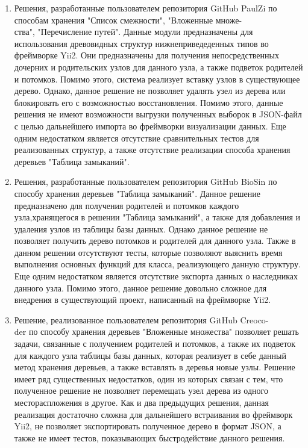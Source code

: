 \documentclass[a4paper,14pt]{extreport}
\theoremstyle{definition}
\begin{document}
\begin{enumerate}
\item Решения, разработанные пользователем репозитория GitHub PaulZi по способам хранения "Список смежности"\cite{Paulzi-AL}, "Вложенные множе- \\ ства"\cite{Paulzi-MP}, "Перечисление путей"\cite{Paulzi-NS}.  Данные модули предназначены для использования древовидных структур нижнеприведеденных типов во фреймворке Yii2. Они предназначены для получения непосредственных дочерних и родительских узлов для данного узла, а также подветок родителей и потомков. Помимо этого, система реализует вставку узлов в существующее дерево. Однако, данное решение не позволяет удалять узел из дерева или блокировать его с возможностью восстановления. Помимо этого, данные решения не имеют возможности выгрузки полученных выборок в JSON-файл с целью дальнейшего импорта во фреймворки визуализации данных. Еще одним недостатком является отсутствие сравнительных тестов для реализованных структур, а также отсутствие реализации способа хранения деревьев "Таблица замыканий".
\item Решения, разработанные пользователем репозитория GitHub BioSin по способу хранения деревьев "Таблица замыканий"\cite{BioSin-CT}. Данное решение предназначено для получения родителей и потомков каждого узла,хранящегося в решении "Таблица замыканий", а также для добавления и удаления узлов из таблицы базы данных. Однако данное решение не позволяет получить дерево потомков и родителей для данного узла. Также в данном решении отсутствуют тесты, которые позволяют выяснить время выполнения основных функций для класса, реализующего данную структуру. Еще одним недостатком является отсутствие экспорта данных о наследниках данного узла. Помимо этого, данное решение довольно сложное для внедрения в существующий проект, написанный на фреймворке Yii2.
\item Решение, реализованное пользователем репозитория GitHub Creoco-\\der по способу хранения деревьев "Вложенные множества"\cite{Creocoder-NS} позволяет решать задачи, связанные с получением родителей и потомков, а также их подветок для каждого узла таблицы базы данных, которая реализует в себе данный метод хранения деревьев, а также вставлять в деревья новые узлы. Решение имеет ряд существенных недостатков, один из которых связан с тем, что полученное решение не позволяет перемещать узел дерева из одного местораспложения в другое. Как и два предыдущих решения, данная реализация достаточно сложна для дальнейшего встраивания во фреймворк Yii2, не позволяет экспортировать полученное дерево в формат JSON, а также не имеет тестов, показывающих быстродействие данного решения.
\end{enumerate}
\end{document}
